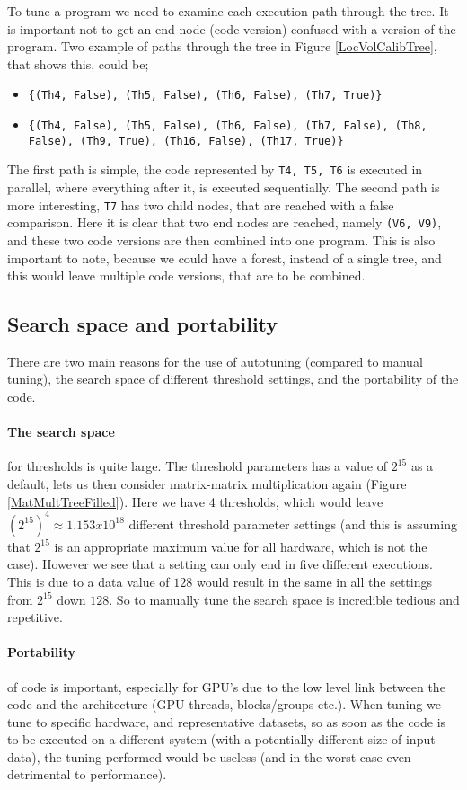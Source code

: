 \noindent To tune a program we need to examine each execution path through the tree. It is important not to get an end node (code version) confused with a version of the program. Two example of paths through the tree in Figure \ref{LocVolCalibTree}, that shows this, could be;
\begin{itemize}
	\item \texttt{\{(Th4, False), (Th5, False), (Th6, False), (Th7, True)\}}
	\item \texttt{\{(Th4, False), (Th5, False), (Th6, False), (Th7, False), (Th8, False), (Th9, True), (Th16, False), (Th17, True)\}}
\end{itemize}  
The first path is simple, the code represented by \texttt{T4, T5, T6} is executed in parallel, where everything after it, is executed sequentially. The second path is more interesting, \texttt{T7} has two child nodes, that are reached with a false comparison. Here it is clear that two end nodes are reached, namely \texttt{(V6, V9)}, and these two code versions are then combined into one program. This is also important to note, because we could have a forest, instead of a single tree, and this would leave multiple code versions, that are to be combined.

\subsection{Search space and portability}
There are two main reasons for the use of autotuning (compared to manual tuning), the search space of different threshold settings, and the portability of the code.
\paragraph{The search space} for thresholds is quite large. The threshold parameters has a value of $2^{15}$ as a default, lets us then consider matrix-matrix multiplication again (Figure \ref{MatMultTreeFilled}). Here we have 4 thresholds, which would leave $(2^{15})^4 \approx 1.153x10^{18}$ different threshold parameter settings (and this is assuming that $2^{15}$ is an appropriate maximum value for all hardware, which is not the case). However we see that a setting can only end in five different executions. This is due to a data value of $128$ would result in the same in all the settings from $2^{15}$ down $128$. So to manually tune the search space is incredible tedious and repetitive.
\paragraph{Portability} of code is important, especially for GPU's due to the low level link between the code and the architecture (GPU threads, blocks/groups etc.). When tuning we tune to specific hardware, and representative datasets, so as soon as the code is to be executed on a different system (with a potentially different size of input data), the tuning performed would be useless (and in the worst case even detrimental to performance).\\

